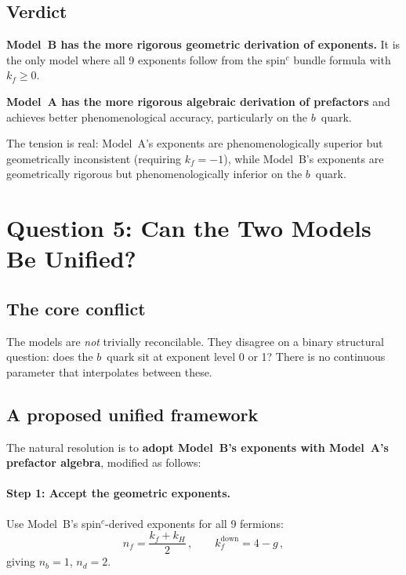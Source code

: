 \documentclass[11pt]{article}
\begin{document}
\subsection{Verdict}

\textbf{Model~B has the more rigorous geometric derivation of exponents.}
It is the only model where all 9 exponents follow from the spin$^c$ bundle
formula with $k_f \geq 0$.

\textbf{Model~A has the more rigorous algebraic derivation of prefactors}
and achieves better phenomenological accuracy, particularly on the $b$~quark.

The tension is real: Model~A's exponents are phenomenologically superior but
geometrically inconsistent (requiring $k_f=-1$), while Model~B's exponents
are geometrically rigorous but phenomenologically inferior on the $b$~quark.

\section{Question 5: Can the Two Models Be Unified?}

\subsection{The core conflict}

The models are \emph{not} trivially reconcilable.  They disagree on a binary
structural question: does the $b$~quark sit at exponent level 0 or 1?
There is no continuous parameter that interpolates between these.

\subsection{A proposed unified framework}

The natural resolution is to \textbf{adopt Model~B's exponents with Model~A's
prefactor algebra}, modified as follows:

\paragraph{Step 1: Accept the geometric exponents.}
Use Model~B's spin$^c$-derived exponents for all 9 fermions:
\[
  n_f = \frac{k_f + k_H}{2}\,,
  \qquad k_f^{\text{down}} = 4-g\,,
\]
giving $n_b = 1$, $n_d = 2$.
\end{document}
